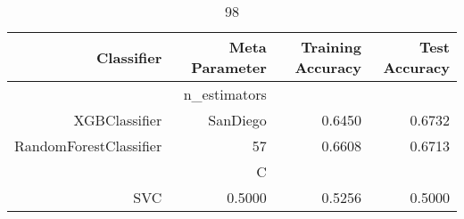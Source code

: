 
\begin{table}[H]
    \caption{98}
    \centering
    \begin{tabular}{|r|r|r|r|}
        \hline
        Classifier &Meta Parameter &Training Accuracy
        &Test Accuracy\\
        \hline
        &n\_estimators &\multicolumn{2}{|r|}{}\\
        \hline
        XGBClassifier &SanDiego &0.6450 &0.6732\\
        \hline
        RandomForestClassifier &57 &0.6608 &0.6713\\
        \hline
        &C &\multicolumn{2}{|r|}{}\\
        \hline
        SVC &0.5000 &0.5256 &0.5000\\
        \hline
    \end{tabular}
\end{table}
